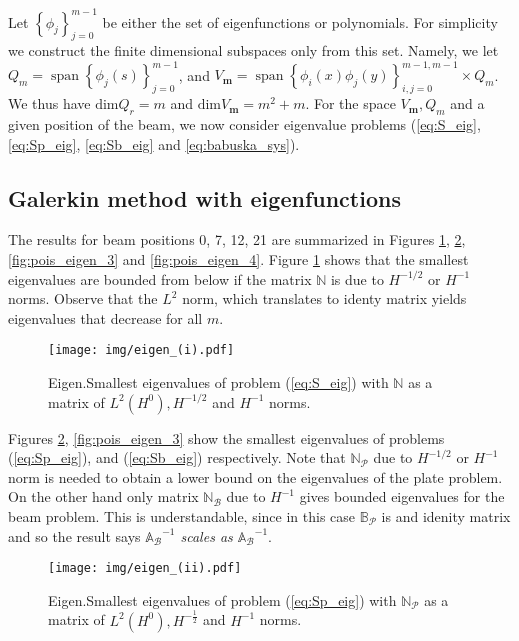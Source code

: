 \documentclass[a4paper,10pt]{article}
\newcommand{\mm}{\ensuremath{\mathbf{m}}}
\newcommand{\Ab}{\ensuremath{\mathbb{A}_{\mathcal{B}}}}
\newcommand{\Bp}{\ensuremath{\mathbb{B}_{\mathcal{P}}}}
\newcommand{\Nmat}{\ensuremath{\mathbb{N}}}
\DeclareMathOperator{\spn}{span}
\begin{document}
Let $\left\{\phi_j\right\}_{j=0}^{m-1}$ be either the set of eigenfunctions or
polynomials. For simplicity we construct the finite dimensional subspaces only
from this set. Namely, we let $Q_m=\spn\left\{\phi_j(s)\right\}_{j=0}^{m-1}$,
and $V_\mm=\spn\left\{\phi_i(x)\phi_j(y)\right\}_{i, j=0}^{m-1,m-1}\times Q_m$.
We thus have $\text{dim}{Q_r}=m$ and $\text{dim}{V_\mm}=m^2+m$. For the space
$V_\mm, Q_m$ and a given position of the beam, we now consider eigenvalue
problems (\ref{eq:S_eig}, \ref{eq:Sp_eig}, \ref{eq:Sb_eig} and
\ref{eq:babuska_sys}).

\subsection{Galerkin method with eigenfunctions}
The results for beam positions 0, 7, 12, 21 are summarized in Figures
\ref{fig:pois_eigen_1}, \ref{fig:pois_eigen_2}, \ref{fig:pois_eigen_3} and
\ref{fig:pois_eigen_4}. Figure \ref{fig:pois_eigen_1} shows that the smallest
eigenvalues are bounded from below if the matrix $\Nmat$ is due to
$H^{-1/2}$ or $H^{-1}$ norms. Observe that the $L^2$ norm, which 
translates to identy matrix yields eigenvalues that decrease for all $m$.
\begin{figure}
  \begin{center}
    \texttt{[image: img/eigen\_(i).pdf]}
    \caption{Eigen.Smallest eigenvalues of problem (\ref{eq:S_eig}) with $\Nmat$ as
    a matrix of $L^2(H^0), H^{-1/2}$ and $H^{-1}$ norms.}
  \label{fig:pois_eigen_1}
  \end{center}
\end{figure}
Figures \ref{fig:pois_eigen_2}, \ref{fig:pois_eigen_3} show the smallest
eigenvalues of problems (\ref{eq:Sp_eig}), and (\ref{eq:Sb_eig}) respectively.
Note that $\Nmat_\mathcal{P}$ due to $H^{-1/2}$ or $H^{-1}$ norm is
needed to obtain a lower bound on the eigenvalues of the plate problem. On the
other hand only matrix $\Nmat_\mathcal{B}$ due to $H^{-1}$ gives bounded
eigenvalues for the beam problem. This is understandable, since in this case
$\Bp$ is and idenity matrix and so the result says \textit{$\Ab^{-1}$ scales as
$\Ab^{-1}$}.
\begin{figure}
  \begin{center}
    \texttt{[image: img/eigen\_(ii).pdf]}
    \caption{Eigen.Smallest eigenvalues of problem (\ref{eq:Sp_eig}) with
      $\Nmat_\mathcal{P}$ as
    a matrix of $L^2(H^0), H^{-\tfrac{1}{2}}$ and $H^{-1}$ norms.}
  \label{fig:pois_eigen_2}
  \end{center}
\end{figure}
\end{document}
